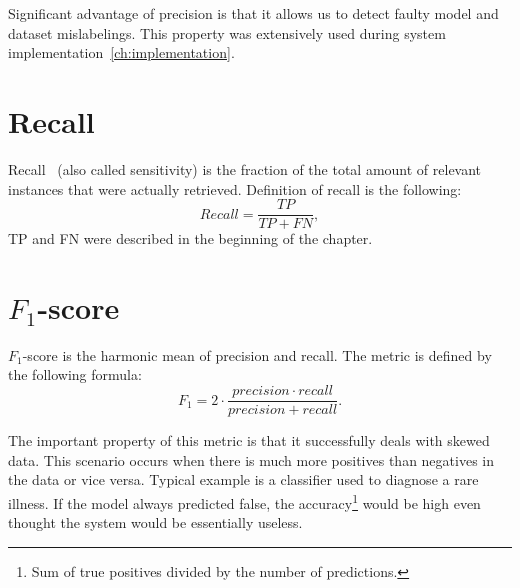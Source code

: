 Significant advantage of precision is that it allows us to detect faulty model and dataset mislabelings.
This property was extensively used during system implementation~\ref{ch:implementation}.

\section{Recall}\label{sec:recall}
Recall~\cite{PreRec} (also called sensitivity) is the fraction of the total amount of relevant instances that were
actually retrieved.
Definition of recall is the following:
\begin{equation}
    Recall = \frac{TP}{TP + FN},
\end{equation}
TP and FN were described in the beginning of the chapter.

\section{$F_1$-score}\label{sec:f-score}
$F_1$-score is the harmonic mean of precision and recall.
The metric is defined by the following formula:
\begin{equation}
    F_1 = 2 \cdot \frac{precision \cdot recall}{precision + recall}.
\end{equation}

The important property of this metric is that it successfully deals with skewed data.
This scenario occurs when there is much more positives than negatives in the data or vice versa.
Typical example is a classifier used to diagnose a rare illness.
If the model always predicted false, the accuracy\footnote{Sum of true positives divided by the number of predictions.}
would be high even thought the system would be essentially useless.